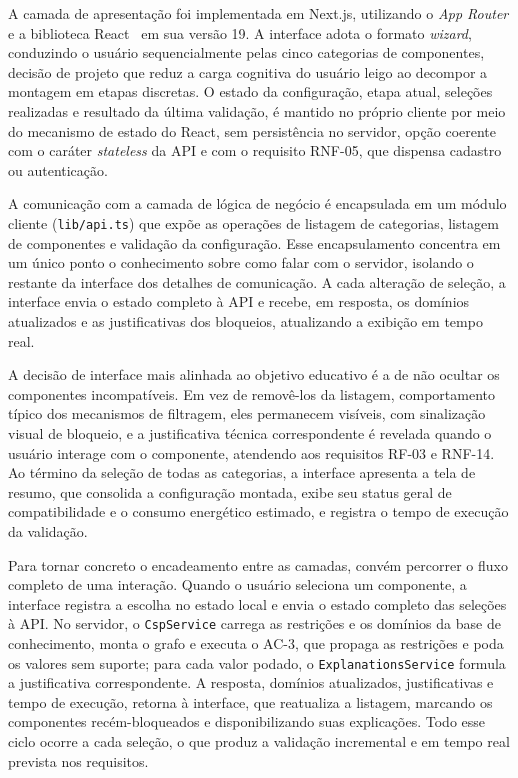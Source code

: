 A camada de apresentação foi implementada em Next.js, utilizando o \textit{App Router} e a biblioteca React~\cite{ReactJS} em sua versão 19. A interface adota o formato \textit{wizard}, conduzindo o usuário sequencialmente pelas cinco categorias de componentes, decisão de projeto que reduz a carga cognitiva do usuário leigo ao decompor a montagem em etapas discretas. O estado da configuração, etapa atual, seleções realizadas e resultado da última validação, é mantido no próprio cliente por meio do mecanismo de estado do React, sem persistência no servidor, opção coerente com o caráter \textit{stateless} da API e com o requisito RNF-05, que dispensa cadastro ou autenticação.

A comunicação com a camada de lógica de negócio é encapsulada em um módulo cliente (\texttt{lib/api.ts}) que expõe as operações de listagem de categorias, listagem de componentes e validação da configuração. Esse encapsulamento concentra em um único ponto o conhecimento sobre como falar com o servidor, isolando o restante da interface dos detalhes de comunicação. A cada alteração de seleção, a interface envia o estado completo à API e recebe, em resposta, os domínios atualizados e as justificativas dos bloqueios, atualizando a exibição em tempo real.

A decisão de interface mais alinhada ao objetivo educativo é a de não ocultar os componentes incompatíveis. Em vez de removê-los da listagem, comportamento típico dos mecanismos de filtragem, eles permanecem visíveis, com sinalização visual de bloqueio, e a justificativa técnica correspondente é revelada quando o usuário interage com o componente, atendendo aos requisitos RF-03 e RNF-14. Ao término da seleção de todas as categorias, a interface apresenta a tela de resumo, que consolida a configuração montada, exibe seu status geral de compatibilidade e o consumo energético estimado, e registra o tempo de execução da validação.

Para tornar concreto o encadeamento entre as camadas, convém percorrer o fluxo completo de uma interação. Quando o usuário seleciona um componente, a interface registra a escolha no estado local e envia o estado completo das seleções à API. No servidor, o \texttt{CspService} carrega as restrições e os domínios da base de conhecimento, monta o grafo e executa o AC-3, que propaga as restrições e poda os valores sem suporte; para cada valor podado, o \texttt{ExplanationsService} formula a justificativa correspondente. A resposta, domínios atualizados, justificativas e tempo de execução, retorna à interface, que reatualiza a listagem, marcando os componentes recém-bloqueados e disponibilizando suas explicações. Todo esse ciclo ocorre a cada seleção, o que produz a validação incremental e em tempo real prevista nos requisitos.

